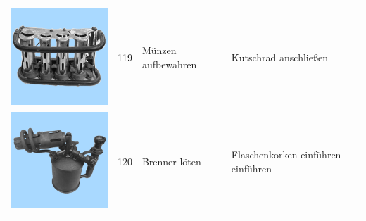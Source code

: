 \documentclass[
  english,
  man,floatsintext]{apa7}
\begin{document}
\begin{center}
\begin{ThreePartTable}
\begin{longtable}{llll}
\includegraphics[valign=c, scale=0.19]{../materials/unfamiliar/119.png} & 119 & Münzen aufbewahren & Kutschrad anschließen\\
\includegraphics[valign=c, scale=0.19]{../materials/unfamiliar/120.png} & 120 & Brenner löten & Flaschenkorken einführen einführen\\
\bottomrule
\end{longtable}

\end{ThreePartTable}
\end{center}
\end{document}
